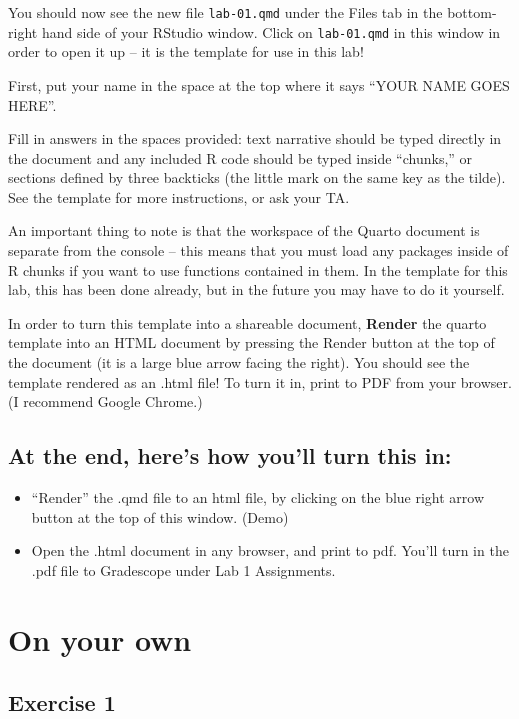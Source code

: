 \documentclass[
  letterpaper,
  DIV=11,
  numbers=noendperiod]{scrartcl}
\begin{document}
You should now see the new file \texttt{lab-01.qmd} under the Files tab
in the bottom-right hand side of your RStudio window. Click on
\texttt{lab-01.qmd} in this window in order to open it up -- it is the
template for use in this lab!

First, put your name in the space at the top where it says ``YOUR NAME
GOES HERE''.

Fill in answers in the spaces provided: text narrative should be typed
directly in the document and any included R code should be typed inside
``chunks,'' or sections defined by three backticks (the little mark on
the same key as the tilde). See the template for more instructions, or
ask your TA.

An important thing to note is that the workspace of the Quarto document
is separate from the console -- this means that you must load any
packages inside of R chunks if you want to use functions contained in
them. In the template for this lab, this has been done already, but in
the future you may have to do it yourself.

In order to turn this template into a shareable document,
\textbf{Render} the quarto template into an HTML document by pressing
the Render button at the top of the document (it is a large blue arrow
facing the right). You should see the template rendered as an .html
file! To turn it in, print to PDF from your browser. (I recommend Google
Chrome.)

\subsection{At the end, here's how you'll turn this
in:}\label{at-the-end-heres-how-youll-turn-this-in}

\begin{itemize}
\item
  ``Render'' the .qmd file to an html file, by clicking on the blue
  right arrow button at the top of this window. (Demo)
\item
  Open the .html document in any browser, and print to pdf. You'll turn
  in the .pdf file to Gradescope under Lab 1 Assignments.
\end{itemize}

\section{On your own}\label{on-your-own}

\subsection{Exercise 1}\label{exercise-1}
\end{document}
